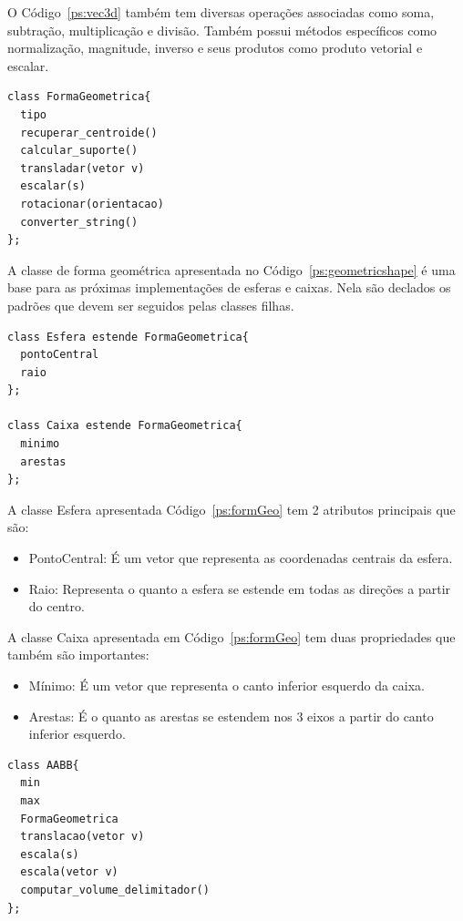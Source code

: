 O Código~\ref{ps:vec3d} também tem diversas operações associadas como soma, subtração,
multiplicação e divisão. Também possui métodos específicos como normalização,
magnitude, inverso e seus produtos como produto vetorial e escalar.

\begin{lstlisting}[frame=single,caption=Modelagem prévia para interface de forma geométrica\label{ps:geometricshape}]
class FormaGeometrica{
  tipo
  recuperar_centroide()
  calcular_suporte()
  transladar(vetor v)
  escalar(s)
  rotacionar(orientacao)
  converter_string()
};
\end{lstlisting}

A classe de forma geométrica apresentada no Código~\ref{ps:geometricshape} é uma base para as próximas implementações de
esferas e caixas. Nela são declados os padrões que devem ser seguidos pelas classes filhas.

\begin{lstlisting}[frame=single,caption=Modelagem prévia para esfera 3d e caixa \label{ps:formGeo}]
class Esfera estende FormaGeometrica{
  pontoCentral
  raio
};

class Caixa estende FormaGeometrica{
  minimo
  arestas
};
\end{lstlisting}

A classe Esfera apresentada Código~\ref{ps:formGeo} tem 2 atributos principais que são:
\begin{itemize}
  \item PontoCentral: É um vetor que representa as coordenadas centrais da esfera.
  \item Raio: Representa o quanto a esfera se estende em todas as direções a partir do centro.
\end{itemize}


A classe Caixa apresentada em Código~\ref{ps:formGeo} tem duas propriedades que também são importantes:
\begin{itemize}
  \item Mínimo: É um vetor que representa o canto inferior esquerdo da caixa.
  \item Arestas: É o quanto as arestas se estendem nos 3 eixos a partir do canto inferior esquerdo.
\end{itemize}


\begin{lstlisting}[frame=single,caption=Modelagem prévia para AABB\label{ps:aabb}]
class AABB{
  min
  max
  FormaGeometrica
  translacao(vetor v)
  escala(s)
  escala(vetor v)
  computar_volume_delimitador()
};
\end{lstlisting}


